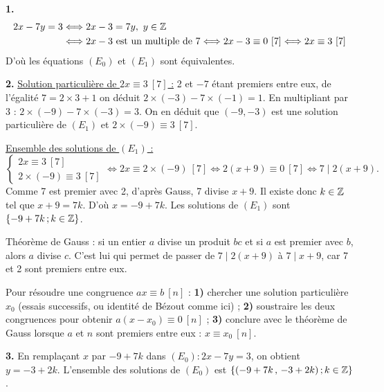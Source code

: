 \documentclass[11pt]{article}
\begin{document}


\textbf{1.}
\begin{align*}
2x - 7y = 3 &\Longleftrightarrow 2x - 3 = 7y,\ y \in \mathbb{Z} \\
&\Longleftrightarrow 2x - 3 \text{ est un multiple de } 7 \Longleftrightarrow 2x - 3 \equiv 0\ [7] \Longleftrightarrow 2x \equiv 3\ [7]
\end{align*}
D'où les équations $(E_0)$ et $(E_1)$ sont équivalentes.

\textbf{2.} \underline{Solution particulière de $2x \equiv 3\ [7]$ :} 2 et $-7$ étant premiers entre eux, de l'égalité $7 = 2 \times 3 + 1$ on déduit $2 \times (-3) - 7 \times (-1) = 1$. En multipliant par 3 : $2 \times (-9) - 7 \times (-3) = 3$. On en déduit que $(-9, -3)$ est une solution particulière de $(E_1)$ et $2 \times (-9) \equiv 3\ [7]$.

\underline{Ensemble des solutions de $(E_1)$ :}
\[ \begin{cases} 2x \equiv 3\ [7] \\ 2 \times (-9) \equiv 3\ [7] \end{cases} \Longleftrightarrow 2x \equiv 2 \times (-9)\ [7] \Longleftrightarrow 2(x + 9) \equiv 0\ [7] \Longleftrightarrow 7 \mid 2(x + 9). \]
Comme 7 est premier avec 2, d'après Gauss, 7 divise $x + 9$. Il existe donc $k \in \mathbb{Z}$ tel que $x + 9 = 7k$. D'où $x = -9 + 7k$. Les solutions de $(E_1)$ sont $\{-9 + 7k\,;k \in \mathbb{Z}\}$.

\begin{rappel}
Théorème de Gauss : si un entier $a$ divise un produit $bc$ et si $a$ est
premier avec $b$, alors $a$ divise $c$. C'est lui qui permet de passer de
$7 \mid 2(x+9)$ à $7 \mid x+9$, car 7 et 2 sont premiers entre eux.
\end{rappel}

\begin{methode}
Pour résoudre une congruence $ax \equiv b\ [n]$ : \textbf{1)} chercher une
solution particulière $x_0$ (essais successifs, ou identité de Bézout comme
ici) ; \textbf{2)} soustraire les deux congruences pour obtenir
$a(x - x_0) \equiv 0\ [n]$ ; \textbf{3)} conclure avec le théorème de Gauss
lorsque $a$ et $n$ sont premiers entre eux : $x \equiv x_0\ [n]$.
\end{methode}

\textbf{3.} En remplaçant $x$ par $-9 + 7k$ dans $(E_0) : 2x - 7y = 3$, on obtient $y = -3 + 2k$. L'ensemble des solutions de $(E_0)$ est $\{(-9 + 7k\,,\,-3 + 2k)\,;k \in \mathbb{Z}\}$.
\end{document}
